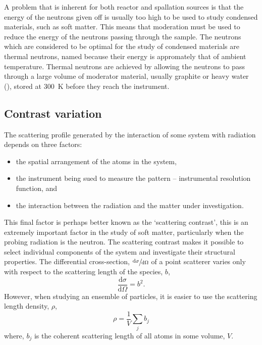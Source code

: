 A problem that is inherent for both reactor and spallation sources is that the energy of the neutrons given off is usually too high to be used to study condensed materials, such as soft matter. This means that moderation must be used to reduce the energy of the neutrons passing through the sample. The neutrons which are considered to be optimal for the study of condensed materials are thermal neutrons, named because their energy is appromately that of ambient temperature. Thermal neutrons are achieved by allowing the neutrons to pass through a large volume of moderator material, usually graphite or heavy water (), stored at \SI{300}{\kelvin} before they reach the instrument.\cite{Sivia2011}

\subsection{Contrast variation}
\label{convar}

The scattering profile generated by the interaction of some system with radiation depends on three factors:
%
\begin{itemize}
	\item the spatial arrangement of the atoms in the system,
	\item the instrument being sued to measure the pattern -- instrumental resolution function, and
	\item the interaction between the radiation and the matter under investigation.
\end{itemize}
%
This final factor is perhaps better known as the `scattering contrast', this is an extremely important factor in the study of soft matter, particularly when the probing radiation is the neutron. The scattering contrast makes it possible to select individual components of the system and investigate their structural properties.\cite{Schurtenberger2002} The differential cross-section, $\sfrac{\text{d}\sigma}{\text{d}\Omega}$ of a point scatterer varies only with respect to the scattering length of the species, $b$,
%
\begin{equation}
	\frac{\text{d}\sigma}{\text{d}\Omega} = b^2.
\end{equation}
%
However, when studying an ensemble of particles, it is easier to use the scattering length density, $\rho$,
%
\begin{equation}
	\rho = \frac{1}{V}\sum_j b_j
\end{equation}
%
where, $b_j$ is the coherent scattering length of all atoms in some volume, $V$.

